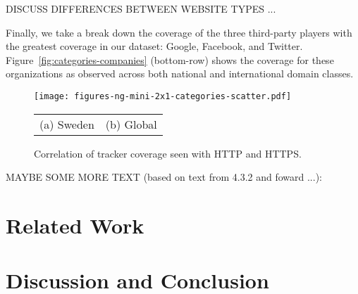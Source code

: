 \documentclass{sig-alternate-10pt}
\begin{document}
DISCUSS DIFFERENCES BETWEEN WEBSITE TYPES ...

Finally, we take a break down the coverage of the three third-party players
with the greatest coverage in our dataset: Google, Facebook, and Twitter.
Figure~\ref{fig:categories-companies} (bottom-row) shows the coverage for these organizations 
as observed across both national and international domain classes.


\begin{figure}[t]
\centering
\texttt{[image: figures-ng-mini-2x1-categories-scatter.pdf]}
\begin{tabular}{cc}
(a) Sweden &
(b) Global \\
\end{tabular}
\caption{Correlation of tracker coverage seen with HTTP and HTTPS.}
\label{fig:scatter}
\vspace{-0pt}
\end{figure}

MAYBE SOME MORE TEXT (based on text from 4.3.2 and foward ...):






\section{Related Work}\label{sec:related}


\section{Discussion and Conclusion}\label{sec:conclusions}



\newpage


%
\vspace{8pt}

\end{document}

